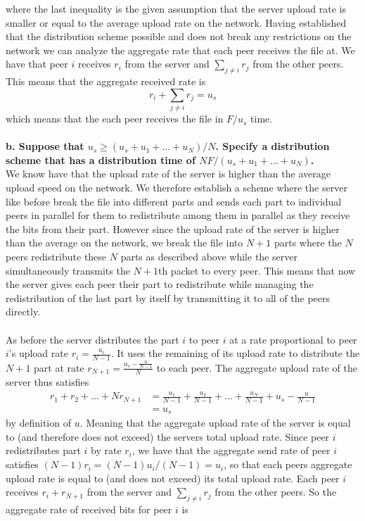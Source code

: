 where the last inequality is the given assumption that the server upload rate is smaller or equal to the average upload rate on the network. Having established that the distribution scheme possible and does not break any restrictions on the network we can analyze the aggregate rate that each peer receives the file at. We have that peer $i$ receives $r_i$ from the server and $\sum_{j \neq i} r_j$ from the other peers. This means that the aggregate received rate is 
\begin{equation*}
    r_i + \sum_{j \neq i} r_j = u_s
\end{equation*}
which means that the each peer receives the file in $F/u_s$ time. \\
\\
\textbf{b. Suppose that $u_s \geq (u_s + u_1 + \dots + u_N)/N$. Specify a distribution scheme that has a distribution time of $NF/(u_s + u_1 + \dots + u_N)$.} \\
We know have that the upload rate of the server is higher than the average upload speed on the network. We therefore establish a scheme where the server like before break the file into different parts and sends each part to individual peers in parallel for them to redistribute among them in parallel as they receive the bits from their part. However since the upload rate of the server is higher than the average on the network, we break the file into $N+1$ parts where the $N$ peers redistribute these $N$ parts as described above while the server simultaneously transmits the $N+1$th packet to every peer. This means that now the server gives each peer their part to redistribute while managing the redistribution of the last part by itself by transmitting it to all of the peers directly. \\
\\
As before the server distributes the part $i$ to peer $i$ at a rate proportional to peer $i$'s upload rate $r_i = \frac{u_i}{N-1}$. It uses the remaining of its upload rate to distribute the $N+1$ part at rate $r_{N+1} = \frac{u_s - \frac{u}{N-1}}{N}$ to each peer. The aggregate upload rate of the server thus satisfies
\begin{equation*}
\begin{split}
    r_1 + r_2 + \dots + N r_{N+1} &= \frac{u_1}{N-1} + \frac{u_2}{N-1} + \dots + \frac{u_N}{N-1} + u_s - \frac{u}{N-1} \\
    &= u_s
\end{split}
\end{equation*}
by definition of $u$. Meaning that the aggregate upload rate of the server is equal to (and therefore does not exceed) the servers total upload rate. Since peer $i$ redistributes part $i$ by rate $r_i$, we have that the aggregate send rate of peer $i$ satisfies $(N-1)r_i = (N-1)u_i/(N-1) = u_i$, so that each peers aggregate upload rate is equal to (and does not exceed) its total upload rate. Each peer $i$ receives $r_i + r_{N+1}$ from the server and $\sum_{j \neq i} r_j$ from the other peers. So the aggregate rate of received bits for peer $i$ is 
